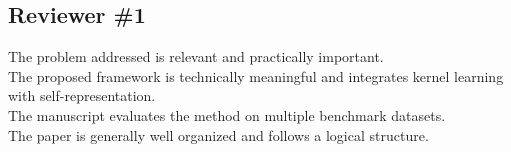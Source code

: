 \documentclass{ar2rc}
\begin{document}
\subsection{Reviewer \#1}
\begin{tcolorbox}[title = {The Reviewer \#1's Comment 1}]
The problem addressed is relevant and practically important. \\
The proposed framework is technically meaningful and integrates kernel learning with self-representation. \\
The manuscript evaluates the method on multiple benchmark datasets. \\
The paper is generally well organized and follows a logical structure.
\end{tcolorbox}
\end{document}
